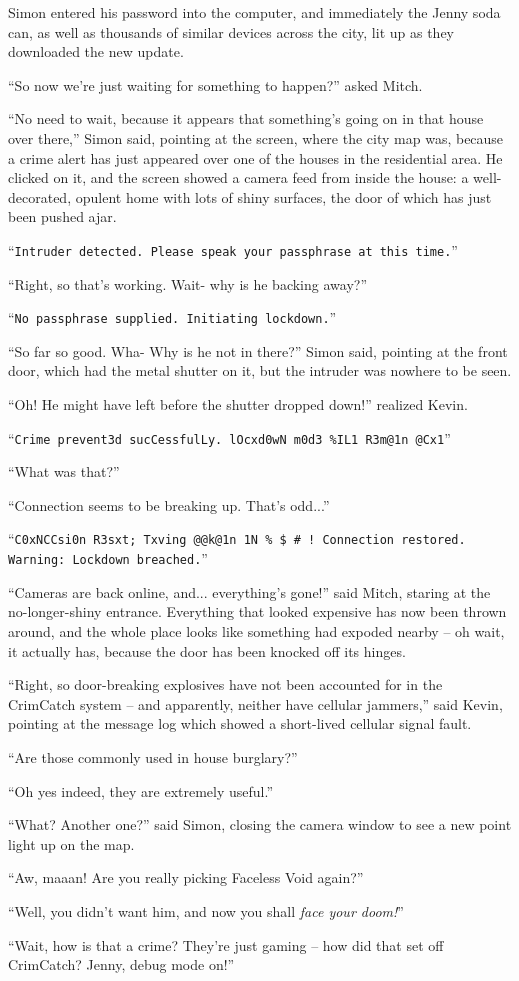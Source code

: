 \documentclass[10pt,a4paper]{article}
\newcommand{\lang}[2]{ #2 \par}
\newcommand{\ai}[2]{
	\lang{
		-- \texttt{#1}
	}{
		``\texttt{#2}''
	}
}
\newcommand{\ainame}{Jenny}
\newcommand{\mainname}{Simon}
\newcommand{\auxname}{Mitch}
\newcommand{\featurename}{CrimCatch}
\newcommand{\criminalname}{Kevin}
\begin{document}
\lang{...}{\mainname{} entered his password into the computer, and immediately the \ainame{} soda can, as well as thousands of similar devices across the city, lit up as they downloaded the new update.}
\lang{...}{``So now we're just waiting for something to happen?'' asked \auxname{}.}
\lang{...}{``No need to wait, because it appears that something's going on in that house over there,'' \mainname{} said, pointing at the screen, where the city map was, because a crime alert has just appeared over one of the houses in the residential area. He clicked on it, and the screen showed a camera feed from inside the house: a well-decorated, opulent home with lots of shiny surfaces, the door of which has just been pushed ajar.}
\ai{...}{Intruder detected. Please speak your passphrase at this time.}
\lang{...}{``Right, so that's working. Wait- why is he backing away?''}
\ai{...}{No passphrase supplied. Initiating lockdown.}
\lang{...}{``So far so good. Wha- Why is he not in there?'' \mainname{} said, pointing at the front door, which had the metal shutter on it, but the intruder was nowhere to be seen.}
\lang{...}{``Oh! He might have left before the shutter dropped down!'' realized \criminalname{}.}
\ai{...}{Crime prevent3d sucCessfulLy. lOcxd0wN m0d3 \%IL1 R3m@1n @Cx1}
\lang{...}{``What was that?''}
\lang{...}{``Connection seems to be breaking up. That's odd...''}
\ai{...}{C0xNCCsi0n R3sxt; Txving @@k@1n 1N \% \$ \# \@ ! Connection restored. Warning: Lockdown breached.}
\lang{...}{``Cameras are back online, and... everything's gone!'' said \auxname{}, staring at the no-longer-shiny entrance. Everything that looked expensive has now been thrown around, and the whole place looks like something had expoded nearby -- oh wait, it actually has, because the door has been knocked off its hinges.}
\lang{...}{``Right, so door-breaking explosives have not been accounted for in the \featurename{} system -- and apparently, neither have cellular jammers,'' said \criminalname{}, pointing at the message log which showed a short-lived cellular signal fault.}
\lang{...}{``Are those commonly used in house burglary?''}
\lang{...}{``Oh yes indeed, they are extremely useful.''}
\lang{...}{``What? Another one?'' said \mainname{}, closing the camera window to see a new point light up on the map.}
\lang{...}{``Aw, maaan! Are you really picking Faceless Void again?''}
\lang{...}{``Well, you didn't want him, and now you shall \emph{face your doom!}''} %
\lang{...}{``Wait, how is that a crime? They're just gaming -- how did that set off \featurename{}? \ainame{}, debug mode on!''}
\end{document}

